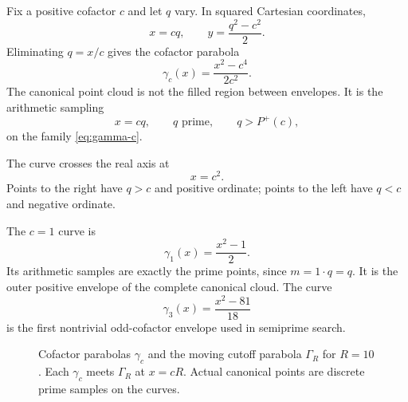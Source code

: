 \documentclass[11pt]{article}
\theoremstyle{definition}
\theoremstyle{remark}
\newcommand{\Pplus}{P^{+}}
\newcommand{\1}{\mathbf{1}}
\newcommand{\Repart}{\operatorname{Re}}
\newcommand{\Impart}{\operatorname{Im}}
\begin{document}
Fix a positive cofactor $c$ and let $q$ vary.  In squared Cartesian coordinates,
\begin{equation}
 x=cq,
 \qquad
 y=\frac{q^2-c^2}{2}.
 \label{eq:curve-param}
\end{equation}
Eliminating $q=x/c$ gives the cofactor parabola
\begin{equation}
 \boxed{
 \gamma_c(x)
 =\frac{x^2-c^4}{2c^2}.
 }
 \label{eq:gamma-c}
\end{equation}
The canonical point cloud is not the filled region between envelopes.  It is the arithmetic sampling
\begin{equation}
 x=cq,
 \qquad
 q\text{ prime},
 \qquad
 q>\Pplus(c),
 \label{eq:curve-sampling}
\end{equation}
on the family \cref{eq:gamma-c}.

The curve crosses the real axis at
\begin{equation}
 x=c^2.
 \label{eq:curve-axis-cross}
\end{equation}
Points to the right have $q>c$ and positive ordinate; points to the left have $q<c$ and negative ordinate.

The $c=1$ curve is
\begin{equation}
 \gamma_1(x)=\frac{x^2-1}{2}.
 \label{eq:prime-curve}
\end{equation}
Its arithmetic samples are exactly the prime points, since $m=1\cdot q=q$.  It is the outer positive envelope of the complete canonical cloud.  The curve
\begin{equation}
 \gamma_3(x)=\frac{x^2-81}{18}
 \label{eq:three-curve}
\end{equation}
is the first nontrivial odd-cofactor envelope used in semiprime search.

\begin{figure}[htbp]
\centering
{}
\caption{Cofactor parabolas $\gamma_c$ and the moving cutoff parabola $\Gamma_R$ for $R=10$.  Each $\gamma_c$ meets $\Gamma_R$ at $x=cR$.  Actual canonical points are discrete prime samples on the curves.}
\label{fig:cofactor-parabolas}
\end{figure}
\end{document}

